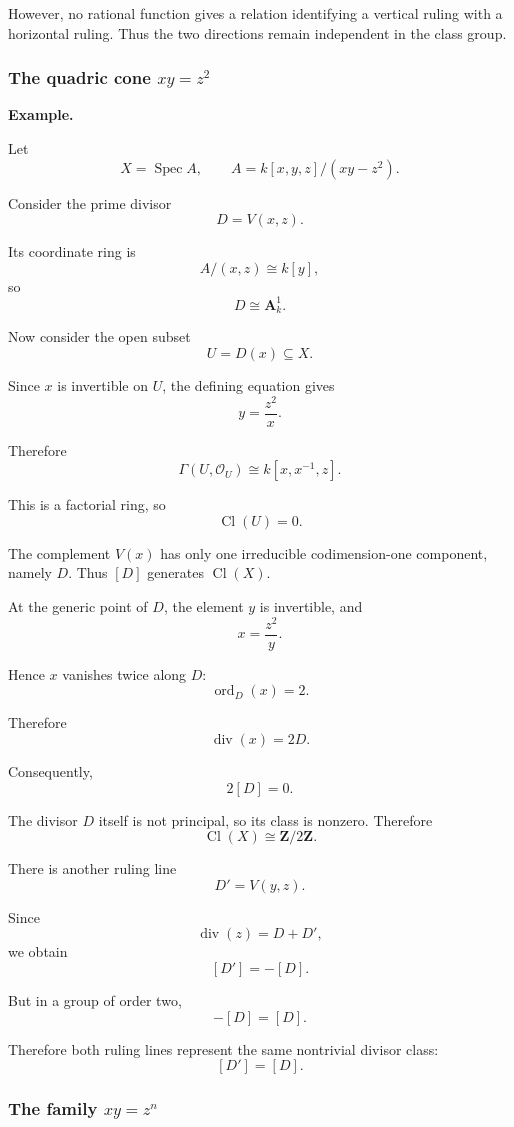 \documentclass[12pt,a4paper]{article}
\theoremstyle{notespace}
\begin{document}
However, no rational function gives a relation identifying a vertical ruling with a horizontal ruling. Thus the two directions remain independent in the class group.

\subsubsection{\texorpdfstring{The quadric cone \(xy=z^2\)}{The quadric cone xy=z2}}

\textbf{Example.}

Let
\[
X=\operatorname{Spec}A,
\qquad
A=k[x,y,z]/(xy-z^2).
\]

Consider the prime divisor
\[
D=V(x,z).
\]

Its coordinate ring is
\[
A/(x,z)
\cong
k[y],
\]
so
\[
D\cong\mathbf A^1_k.
\]

Now consider the open subset
\[
U=D(x)\subseteq X.
\]

Since \(x\) is invertible on \(U\), the defining equation gives
\[
y=\frac{z^2}{x}.
\]

Therefore
\[
\Gamma(U,\mathcal O_U)
\cong
k[x,x^{-1},z].
\]

This is a factorial ring, so
\[
\operatorname{Cl}(U)=0.
\]

The complement \(V(x)\) has only one irreducible codimension-one component, namely \(D\). Thus \([D]\) generates \(\operatorname{Cl}(X)\).

At the generic point of \(D\), the element \(y\) is invertible, and
\[
x=\frac{z^2}{y}.
\]

Hence \(x\) vanishes twice along \(D\):
\[
\operatorname{ord}_D(x)=2.
\]

Therefore
\[
\operatorname{div}(x)=2D.
\]

Consequently,
\[
2[D]=0.
\]

The divisor \(D\) itself is not principal, so its class is nonzero. Therefore
\[
\boxed{
	\operatorname{Cl}(X)\cong\mathbf Z/2\mathbf Z.
}
\]

There is another ruling line
\[
D'=V(y,z).
\]

Since
\[
\operatorname{div}(z)=D+D',
\]
we obtain
\[
[D']=-[D].
\]

But in a group of order two,
\[
-[D]=[D].
\]

Therefore both ruling lines represent the same nontrivial divisor class:
\[
[D']=[D].
\]

\subsubsection{\texorpdfstring{The family \(xy=z^n\)}{The family xy=zn}}
\end{document}
